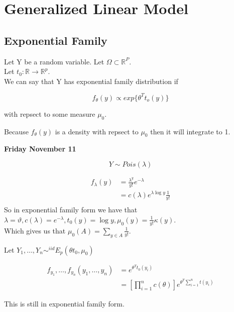\documentclass[11pt,fleqn]{book} %
\begin{document}
 \chapter{Generalized Linear Model}

\section{Exponential Family}

Let Y be a random variable. Let $\Omega \subset \mathbb{R}^P$. \\

Let $t_0: \mathbb{R} \rightarrow \mathbb{R}^p$. \\

We can say that Y has exponential family distribution if 

		$$f_\theta(y) \propto exp\{\theta^T t_o (y)\} $$

with repsect to some measure $\mu_0$.

Because $f_\theta(y)$ is a density with repsect to $\mu_0$ then it will integrate to 1. 


\textbf{Friday November 11}\\


\begin{example}
			$$Y \sim Pois(\lambda)$$

			\begin{align*}
				f_\lambda(y) &= \frac{\lambda^y}{y!} e^{-\lambda}\\
						&=c(\lambda) e^{\lambda \log y} \frac{1}{y!}\\
			\end{align*}
So in exponential family form we have that $\lambda = \vartheta, c(\lambda) = e^{-\lambda}, t_0(y) = \log y, \mu_0(y) = \frac{1}{y!} \kappa(y)$.\\

Which gives us that $\mu_0(A) = \sum_{y \in A} \frac{1}{y!}$.\\
\end{example}


Let $Y_1, \dots, Y_n \sim^{iid} E_p (\theta t_0, \mu_0)$

		\begin{align}
			f_{y_1}, \dots, f_{y_n} (y_1, \dots, y_n) &=   e^{\theta^T t_0(y_i)} \\
						&= \left[\prod^n_{i =1} c(\theta)\right]e^{\theta^T \sum^n_{i=1} t(y_i)}
		\end{align}


This is still in exponential family form. 
\end{document}
